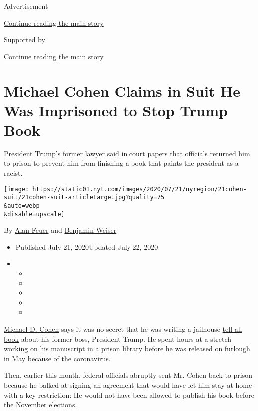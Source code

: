 Advertisement

\protect\hyperlink{after-top}{Continue reading the main story}

Supported by

\protect\hyperlink{after-sponsor}{Continue reading the main story}

\hypertarget{michael-cohen-claims-in-suit-he-was-imprisoned-to-stop-trump-book}{%
\section{Michael Cohen Claims in Suit He Was Imprisoned to Stop Trump
Book}\label{michael-cohen-claims-in-suit-he-was-imprisoned-to-stop-trump-book}}

President Trump's former lawyer said in court papers that officials
returned him to prison to prevent him from finishing a book that paints
the president as a racist.

\texttt{[image: https://static01.nyt.com/images/2020/07/21/nyregion/21cohen-suit/21cohen-suit-articleLarge.jpg?quality=75\\\&auto=webp\\\&disable=upscale]}

By \href{https://www.nytimes.com/by/alan-feuer}{Alan Feuer} and
\href{https://www.nytimes.com/by/benjamin-weiser}{Benjamin Weiser}

\begin{itemize}
\item
  Published July 21, 2020Updated July 22, 2020
\item
  \begin{itemize}
  \item
  \item
  \item
  \item
  \item
  \end{itemize}
\end{itemize}

\href{https://www.nytimes.com/2020/07/23/nyregion/michael-cohen-trump-book.html}{Michael
D. Cohen} says it was no secret that he was writing a jailhouse
\href{https://www.nytimes.com/2020/07/22/nyregion/michael-cohen-donald-trump-prison.html}{tell-all
book} about his former boss, President Trump. He spent hours at a
stretch working on his manuscript in a prison library before he was
released on furlough in May because of the coronavirus.

Then, earlier this month, federal officials abruptly sent Mr. Cohen back
to prison because he balked at signing an agreement that would have let
him stay at home with a key restriction: He would not have been allowed
to publish his book before the November elections.

